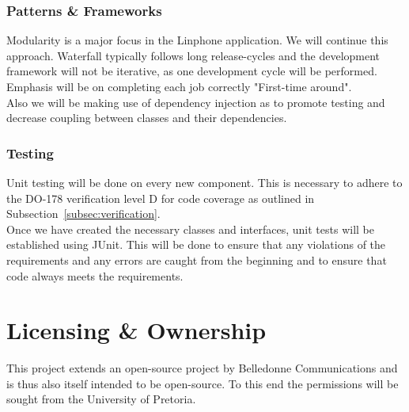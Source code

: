 \documentclass[11pt]{article}
\begin{document}
\subsubsection{Patterns \& Frameworks}
Modularity is a major focus in the Linphone application. We will continue this approach. Waterfall typically follows long release-cycles and the development framework will not be iterative, as one development cycle will be performed. Emphasis will be on completing each job correctly "First-time around". \\ 
Also we will be making use of dependency injection as to promote testing and decrease coupling between classes and their dependencies.
\subsubsection{Testing}
Unit testing will be done on every new component. This is necessary to adhere to the DO-178 verification level D for code coverage as outlined in Subsection~\ref{subsec:verification}.\\
Once we have created the necessary classes and interfaces, unit tests will be established using JUnit. This will be done to ensure that any violations of the requirements and any errors are caught from the beginning and to ensure that code always meets the requirements.

\section{Licensing \& Ownership}
This project extends an open-source project by Belledonne Communications and is thus also itself intended to be open-source. To this end the permissions will be sought from the University of Pretoria.
\end{document}
